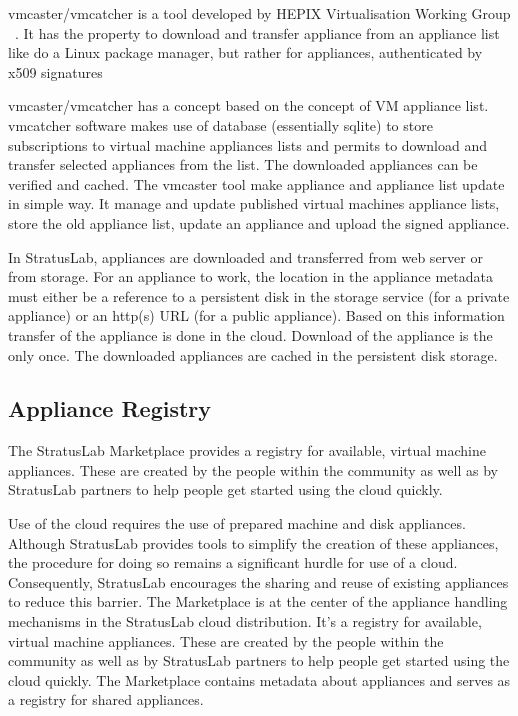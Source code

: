 vmcaster/vmcatcher is a tool developed by HEPIX Virtualisation Working
Group ~\cite{hepixbook}. It has the property to download and transfer appliance from an
appliance list like do a Linux package manager, but rather for
appliances, authenticated by x509 signatures

vmcaster/vmcatcher has a concept based on the concept of VM appliance
list.  vmcatcher software makes use of database (essentially sqlite)
to store subscriptions to virtual machine appliances lists and permits
to download and transfer selected appliances from the list. The
downloaded appliances can be verified and cached.  The vmcaster tool
make appliance and appliance list update in simple way. It manage and
update published virtual machines appliance lists, store the old
appliance list, update an appliance and upload the signed appliance.

In StratusLab, appliances are downloaded and transferred from web
server or from storage. For an appliance to work, the location in the
appliance metadata must either be a reference to a persistent disk in
the storage service (for a private appliance) or an http(s) URL (for a
public appliance). Based on this information transfer of the appliance
is done in the cloud.  Download of the appliance is the only once. The
downloaded appliances are cached in the persistent disk storage.

\subsection{Appliance Registry}

The StratusLab Marketplace provides a registry for available, virtual
machine appliances. These are created by the people within the
community as well as by StratusLab partners to help people get started
using the cloud quickly.

Use of the cloud requires the use of prepared machine and disk
appliances. Although StratusLab provides tools to simplify the
creation of these appliances, the procedure for doing so remains a
significant hurdle for use of a cloud. Consequently, StratusLab
encourages the sharing and reuse of existing appliances to reduce this
barrier.  The Marketplace is at the center of the appliance handling
mechanisms in the StratusLab cloud distribution. It's a registry for
available, virtual machine appliances. These are created by the people
within the community as well as by StratusLab partners to help people
get started using the cloud quickly.  The Marketplace contains
metadata about appliances and serves as a registry for shared
appliances.

